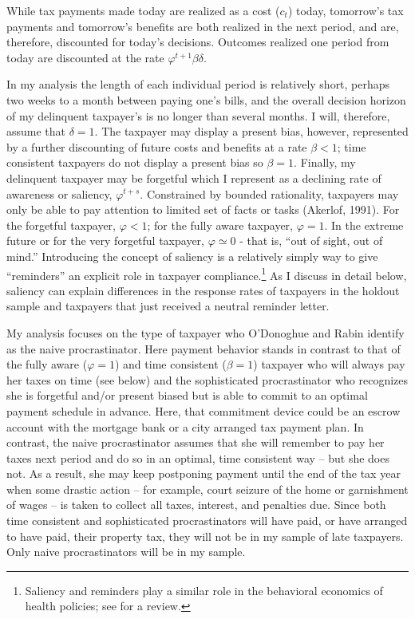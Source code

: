 While tax payments made today are realized as a cost  ($c_{t}$) today,
tomorrow's tax payments and tomorrow's benefits are both realized in
the next period, and are, therefore, discounted for today's decisions.
Outcomes realized one period from today are discounted at the rate
$\varphi^{t+1} \beta \delta$.

In my analysis the length of each individual period is relatively
short, perhaps two weeks to a month between paying one's bills, and
the overall decision horizon of my delinquent taxpayer's is no longer
than several months.  I will, therefore, assume that $\delta=1$.  The
taxpayer may display a present bias, however, represented by a further
discounting of future costs and benefits at a rate $\beta <1$; time
consistent taxpayers do not display a present bias so $\beta=1$.
Finally, my delinquent taxpayer may be forgetful which I represent
as a declining rate of awareness or saliency, $\varphi^{t+s}$.
Constrained by bounded rationality, taxpayers may only be able to pay
attention to limited set of facts or tasks (Akerlof, 1991).  For the
forgetful taxpayer, $\varphi < 1$; for the fully aware taxpayer,
$\varphi = 1$. In the extreme future or for the very forgetful
taxpayer, $\varphi \simeq 0$ - that is, ``out of sight, out of mind.''
Introducing the concept of saliency is a relatively simply way to give
``reminders'' an explicit role in taxpayer compliance.\footnote{
  Saliency and reminders play a similar role in the behavioral
  economics of health policies; see \cite{Kessler-Zhang-14} for a
  review.} As I discuss in detail below, saliency can explain
differences in the response rates of taxpayers in the holdout sample
and taxpayers that just received a neutral reminder letter.

My analysis focuses on the type of taxpayer who O'Donoghue and Rabin
identify as the naive procrastinator.  Here payment behavior stands in
contrast to that of the fully aware ($\varphi = 1$) and time
consistent ($\beta = 1$) taxpayer who will always pay her taxes on
time (see below) and the sophisticated procrastinator who recognizes
she is forgetful and/or present biased but is able to commit to an
optimal payment schedule in advance.  Here, that commitment device
could be an escrow account with the mortgage bank or a city arranged
tax payment plan.  In contrast, the naive procrastinator assumes that
she will remember to pay her taxes next period and do so in an
optimal, time consistent way -- but she does not.  As a result, she
may keep postponing payment until the end of the tax year when some
drastic action -- for example, court seizure of the home or
garnishment of wages -- is taken to collect all taxes, interest, and
penalties due.  Since both time consistent and sophisticated
procrastinators will have paid, or have arranged to have paid, their
property tax, they will not be in my sample of late taxpayers.  Only
naive procrastinators will be in my sample.

